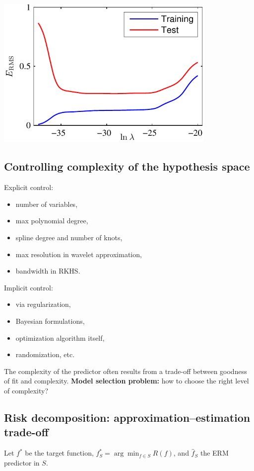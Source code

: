 \vspace{0.2cm}

\includegraphics[width=0.8\textwidth]{figures/poly_ridge_err.png}


\subsection*{Controlling complexity of the hypothesis space}
Explicit control:
\begin{itemize}
    \item number of variables,
    \item max polynomial degree,
    \item spline degree and number of knots,
    \item max resolution in wavelet approximation,
    \item bandwidth in RKHS.
\end{itemize}

Implicit control:
\begin{itemize}
    \item via regularization,
    \item Bayesian formulations,
    \item optimization algorithm itself,
    \item randomization, etc.
\end{itemize}

\medskip

\noindent The complexity of the predictor often results from a trade-off between goodness of fit and complexity.  
\textbf{Model selection problem:} how to choose the right level of complexity?

\subsection*{Risk decomposition: approximation--estimation trade-off}
Let $f^*$ be the target function, $f^*_S = \arg\min_{f\in S} R(f)$, and $\hat f_S$ the ERM predictor in $S$.

